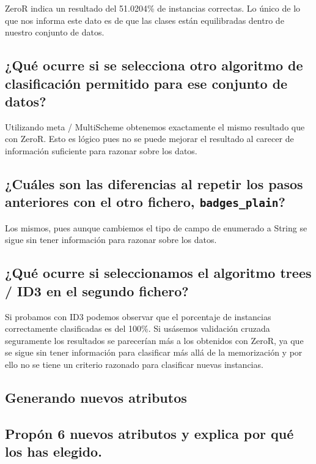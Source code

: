 \documentclass[12pt]{article}
\begin{document}
ZeroR indica un resultado del 51.0204\% de instancias correctas. Lo único de lo
que nos informa este dato es de que las clases están equilibradas dentro de
nuestro conjunto de datos.

\subsection*{\small ¿Qué ocurre si se selecciona otro algoritmo de clasificación
permitido para ese conjunto de datos?}

Utilizando meta / MultiScheme obtenemos exactamente el mismo resultado que con
ZeroR. Esto es lógico pues no se puede mejorar el resultado al carecer de
información suficiente para razonar sobre los datos.

\subsection*{\small ¿Cuáles son las diferencias al repetir los pasos anteriores
con el otro fichero, \texttt{badges\_plain}?}

Los mismos, pues aunque cambiemos el tipo de campo de enumerado a String se
sigue sin tener información para razonar sobre los datos.

\subsection*{\small ¿Qué ocurre si seleccionamos el algoritmo trees / ID3 en el
segundo fichero?}

Si probamos con ID3 podemos observar que el porcentaje de instancias
correctamente clasificadas es del 100\%. Si usásemos validación cruzada
seguramente los resultados se parecerían más a los obtenidos con ZeroR, ya que
se sigue sin tener información para clasificar más allá de la memorización y
por ello no se tiene un criterio razonado para clasificar nuevas instancias.

\newpage

\begin{center}
\section{Generando nuevos atributos}
\end{center}

\subsection*{\small Propón 6 nuevos atributos y explica por qué los has elegido.}
\end{document}
